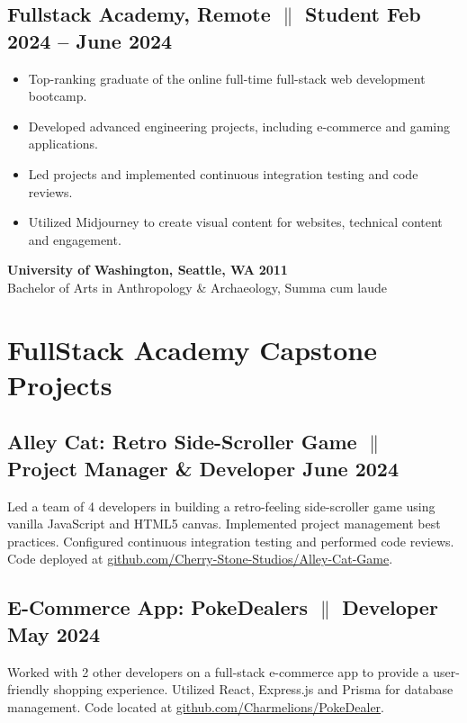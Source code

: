 \documentclass[a4paper,9pt]{article}
\begin{document}
\subsection{Fullstack Academy, Remote {$\parallel$}{ Student} \hfill
      \textbf{Feb
            2024 – June
            2024}}
\begin{itemize}
      \item Top-ranking graduate of the online full-time full-stack web
            development
            bootcamp.
      \item Developed advanced engineering projects, including e-commerce and gaming applications.
      \item Led projects and implemented continuous integration testing and code reviews.
      \item Utilized Midjourney to create visual content for websites, technical content and engagement.\\
\end{itemize}

\textbf{University of Washington, Seattle, WA} \hfill
\textbf{2011}
\\
Bachelor of Arts in Anthropology \& Archaeology, Summa cum laude

\section{FullStack Academy Capstone Projects}

\subsection{Alley Cat: Retro Side-Scroller Game {$\parallel$}{
                  Project Manager
                  \& Developer}
      \hfill \textbf{June 2024}}
{\small Led a team of 4 developers in building a retro-feeling
      side-scroller game using vanilla JavaScript and HTML5 canvas.
      Implemented
      project management best practices. Configured continuous integration testing and
      performed
      code reviews. Code deployed at \href{https://github.com/Cherry-Stone-Studios/Alley-Cat-Game}{github.com/Cherry-Stone-Studios/Alley-Cat-Game}.}

\subsection{E-Commerce App: PokeDealers {$\parallel$}{ Developer}
      \hfill \textbf{May 2024}}
{\small Worked with 2 other developers on a full-stack e-commerce
      app to provide a user-friendly shopping experience. Utilized React, Express.js and Prisma for database management. Code located
      at \href{https://github.com/Charmelions/PokeDealer}{github.com/Charmelions/PokeDealer}.}
\end{document}
